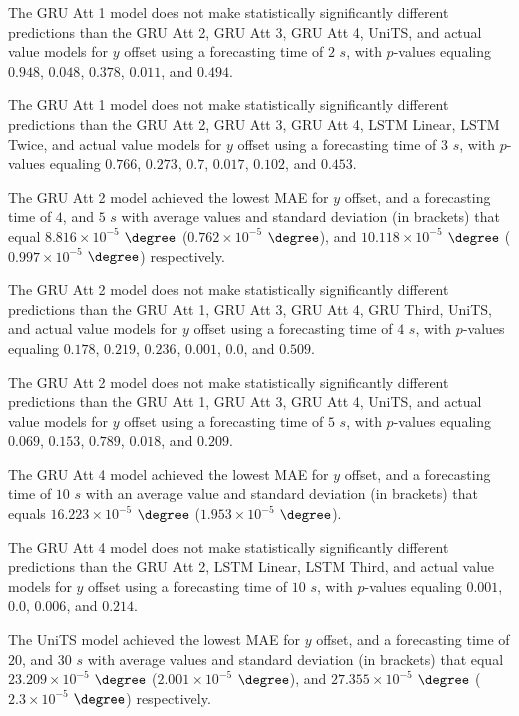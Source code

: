 The GRU Att 1 model does not make statistically significantly different predictions than the GRU Att 2, GRU Att 3, GRU Att 4, UniTS, and actual value models for $y$ offset using a forecasting time of $2$ $s$, with $p$-values equaling $0.948$, $0.048$, $0.378$, $0.011$, and $0.494$.

The GRU Att 1 model does not make statistically significantly different predictions than the GRU Att 2, GRU Att 3, GRU Att 4, LSTM Linear, LSTM Twice, and actual value models for $y$ offset using a forecasting time of $3$ $s$, with $p$-values equaling $0.766$, $0.273$, $0.7$, $0.017$, $0.102$, and $0.453$.

The GRU Att 2 model achieved the lowest MAE for $y$ offset, and a forecasting time of $4$, and $5$ $s$ with average values and standard deviation (in brackets) that equal $8.816 \times 10^{-5}$ $\degree$ ($0.762 \times 10^{-5}$ $\degree$), and $10.118 \times 10^{-5}$ $\degree$ ($0.997 \times 10^{-5}$ $\degree$) respectively.

The GRU Att 2 model does not make statistically significantly different predictions than the GRU Att 1, GRU Att 3, GRU Att 4, GRU Third, UniTS, and actual value models for $y$ offset using a forecasting time of $4$ $s$, with $p$-values equaling $0.178$, $0.219$, $0.236$, $0.001$, $0.0$, and $0.509$.

The GRU Att 2 model does not make statistically significantly different predictions than the GRU Att 1, GRU Att 3, GRU Att 4, UniTS, and actual value models for $y$ offset using a forecasting time of $5$ $s$, with $p$-values equaling $0.069$, $0.153$, $0.789$, $0.018$, and $0.209$.

The GRU Att 4 model achieved the lowest MAE for $y$ offset, and a forecasting time of $10$ $s$ with an average value and standard deviation (in brackets) that equals $16.223 \times 10^{-5}$ $\degree$ ($1.953 \times 10^{-5}$ $\degree$).

The GRU Att 4 model does not make statistically significantly different predictions than the GRU Att 2, LSTM Linear, LSTM Third, and actual value models for $y$ offset using a forecasting time of $10$ $s$, with $p$-values equaling $0.001$, $0.0$, $0.006$, and $0.214$.

The UniTS model achieved the lowest MAE for $y$ offset, and a forecasting time of $20$, and $30$ $s$ with average values and standard deviation (in brackets) that equal $23.209 \times 10^{-5}$ $\degree$ ($2.001 \times 10^{-5}$ $\degree$), and $27.355 \times 10^{-5}$ $\degree$ ($2.3 \times 10^{-5}$ $\degree$) respectively.

